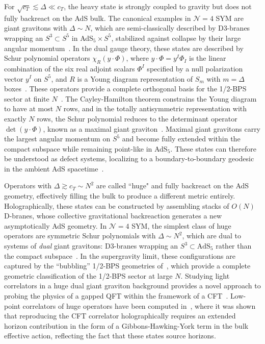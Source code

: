 \documentclass[a4paper,11pt]{article}
\theoremstyle{plain}
\theoremstyle{definition}
\theoremstyle{remark}
\newcommand{\De}{\Delta}
\begin{document}
For $\sqrt{c_T} \lesssim \De \ll c_T$, the heavy state is strongly coupled to gravity but does not fully backreact on the AdS bulk. The canonical examples in $\mathcal{N} = 4$ SYM are giant gravitons with $\De \sim N$, which are semi-classically described by D3-branes wrapping an $S^3 \subset S^5$ in AdS${}_5 \times S^5$, stabilized against collapse by their large angular momentum~\cite{McGreevy:2000cw}.  In the dual gauge theory, these states are described by Schur polynomial operators $\chi_R(y \cdot\Phi )$, where $y \cdot \Phi  = y^I \Phi_I$ is the linear combination of the six real adjoint scalars $\Phi^I$ specified by a null polarization vector $y^I$ on $S^5$, and $R$ is a Young diagram representation of $S_m$ with $m = \De$ boxes~\cite{Corley:2001zk, deMelloKoch:2024sdf}. These operators provide a complete orthogonal basis for the 1/2-BPS sector at finite $N$~\cite{Corley:2001zk}. The Cayley-Hamilton theorem constrains the Young diagram to have at most $N$ rows, and in the totally antisymmetric representation with exactly $N$ rows, the Schur polynomial reduces to the determinant operator $\det(y\cdot\Phi )$, known as a maximal giant graviton~\cite{McGreevy:2000cw, Balasubramanian:2001nh}. Maximal giant gravitons carry the largest angular momentum on $S^5$ and become fully extended within the compact subspace while remaining point-like in AdS${}_5$. These states can therefore be understood as defect systems, localizing to a boundary-to-boundary geodesic in the ambient AdS spacetime~\cite{Chen:2025yxg,Chen:2026ium}. 

Operators with $\De \gtrsim c_T \sim N^2$ are called ``huge" and fully backreact on the AdS geometry, effectively filling the bulk to produce a different metric entirely. Holographically, these states can be constructed by assembling stacks of $O(N)$ D-branes, whose collective gravitational backreaction generates a new asymptotically AdS geometry. In $\mathcal{N} = 4$ SYM, the simplest class of huge operators are symmetric Schur polynomials with $\De \sim N^2$, which are dual to systems of \textit{dual} giant gravitons: D3-branes wrapping an $S^3 \subset \mathrm{AdS}_5$ rather than the compact subspace~\cite{Grisaru:2000zn}. In the supergravity limit, these configurations are captured by the ``bubbling'' 1/2-BPS geometries of~\cite{Lin:2004nb}, which provide a complete geometric classification of the 1/2-BPS sector at large $N$. Studying light correlators in a huge dual giant graviton background provides a novel approach to probing the physics of a gapped QFT within the framework of a CFT~\cite{Ivanovskiy:2024vel}. Low-point correlators of huge operators have been computed in~\cite{Abajian2023-xw, Abajian:2023bqv,Kazakov:2024ald}, where it was shown that reproducing the CFT correlator holographically requires an extended horizon contribution in the form of a Gibbons-Hawking-York term in the bulk effective action, reflecting the fact that these states source horizons.
 
\end{document}
